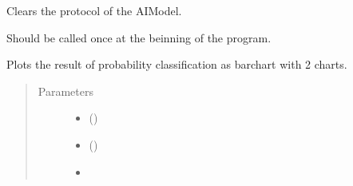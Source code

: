 \documentclass[letterpaper,10pt,english]{sphinxmanual}
\begin{document}
\begin{fulllineitems}
\begin{fulllineitems}
\begin{quote}
\begin{description}
\begin{itemize}
\end{itemize}

\end{description}\end{quote}

\end{fulllineitems}


\begin{fulllineitems}
\label{\detokenize{anoog.automation:anoog.automation.ai_model.AI_Model.clean_log}}
\sphinxAtStartPar
Clears the protocol of the AI\sphinxhyphen{}Model.

\sphinxAtStartPar
Should be called once at the beinning of the program.

\end{fulllineitems}


\begin{fulllineitems}
\label{\detokenize{anoog.automation:anoog.automation.ai_model.AI_Model.draw_result}}
\sphinxAtStartPar
Plots the result of probability classification as bar\sphinxhyphen{}chart with 2 charts.
\begin{quote}\begin{description}
\item[{Parameters}] \leavevmode\begin{itemize}
\item {} 
\sphinxAtStartPar
{} () \textendash{} 

\item {} 
\sphinxAtStartPar
{} () \textendash{} 

\item {} 
\sphinxAtStartPar
{} \textendash{} 


\end{itemize}
\end{description}
\end{quote}
\end{fulllineitems}
\end{fulllineitems}
\end{document}
